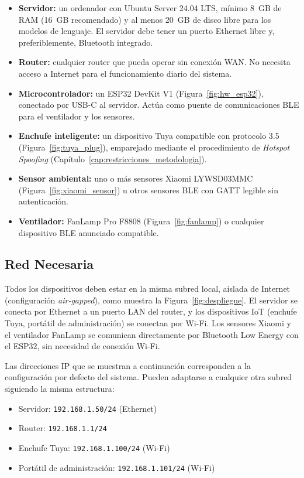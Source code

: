 \begin{itemize}
    \item \textbf{Servidor:} un ordenador con Ubuntu Server 24.04 LTS, mínimo 8~GB de RAM (16~GB recomendado) y al menos 20~GB de disco libre para los modelos de lenguaje. El servidor debe tener un puerto Ethernet libre y, preferiblemente, Bluetooth integrado.
    \item \textbf{Router:} cualquier router que pueda operar sin conexión WAN. No necesita acceso a Internet para el funcionamiento diario del sistema.
    \item \textbf{Microcontrolador:} un ESP32 DevKit V1 (Figura~\ref{fig:hw_esp32}), conectado por USB-C al servidor. Actúa como puente de comunicaciones BLE para el ventilador y los sensores.
    \item \textbf{Enchufe inteligente:} un dispositivo Tuya compatible con protocolo 3.5 (Figura~\ref{fig:tuya_plug}), emparejado mediante el procedimiento de \textit{Hotspot Spoofing} (Capítulo~\ref{cap:restricciones_metodologia}).
    \item \textbf{Sensor ambiental:} uno o más sensores Xiaomi LYWSD03MMC (Figura~\ref{fig:xiaomi_sensor}) u otros sensores BLE con GATT legible sin autenticación.
    \item \textbf{Ventilador:} FanLamp Pro F8808 (Figura~\ref{fig:fanlamp}) o cualquier dispositivo BLE anunciado compatible.
\end{itemize}

\subsection{Red Necesaria}

Todos los dispositivos deben estar en la misma subred local, aislada de Internet (configuración \textit{air-gapped}), como muestra la Figura~\ref{fig:despliegue}. El servidor se conecta por Ethernet a un puerto LAN del router, y los dispositivos IoT (enchufe Tuya, portátil de administración) se conectan por Wi-Fi. Los sensores Xiaomi y el ventilador FanLamp se comunican directamente por Bluetooth Low Energy con el ESP32, sin necesidad de conexión Wi-Fi.

Las direcciones IP que se muestran a continuación corresponden a la configuración por defecto del sistema. Pueden adaptarse a cualquier otra subred siguiendo la misma estructura:

\begin{itemize}
    \item Servidor: \texttt{192.168.1.50/24} (Ethernet)
    \item Router: \texttt{192.168.1.1/24}
    \item Enchufe Tuya: \texttt{192.168.1.100/24} (Wi-Fi)
    \item Portátil de administración: \texttt{192.168.1.101/24} (Wi-Fi)
\end{itemize}

